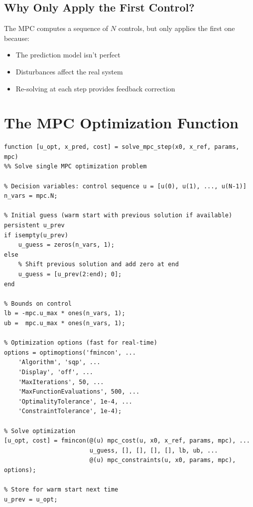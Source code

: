 \documentclass[11pt]{article}
\begin{document}
\subsection{Why Only Apply the First Control?}

The MPC computes a sequence of $N$ controls, but only applies the first one because:
\begin{itemize}
    \item The prediction model isn't perfect
    \item Disturbances affect the real system
    \item Re-solving at each step provides feedback correction
\end{itemize}

\section{The MPC Optimization Function}

\begin{lstlisting}
function [u_opt, x_pred, cost] = solve_mpc_step(x0, x_ref, params, mpc)
%% Solve single MPC optimization problem

% Decision variables: control sequence u = [u(0), u(1), ..., u(N-1)]
n_vars = mpc.N;

% Initial guess (warm start with previous solution if available)
persistent u_prev
if isempty(u_prev)
    u_guess = zeros(n_vars, 1);
else
    % Shift previous solution and add zero at end
    u_guess = [u_prev(2:end); 0];
end

% Bounds on control
lb = -mpc.u_max * ones(n_vars, 1);
ub =  mpc.u_max * ones(n_vars, 1);

% Optimization options (fast for real-time)
options = optimoptions('fmincon', ...
    'Algorithm', 'sqp', ...
    'Display', 'off', ...
    'MaxIterations', 50, ...
    'MaxFunctionEvaluations', 500, ...
    'OptimalityTolerance', 1e-4, ...
    'ConstraintTolerance', 1e-4);

% Solve optimization
[u_opt, cost] = fmincon(@(u) mpc_cost(u, x0, x_ref, params, mpc), ...
                        u_guess, [], [], [], [], lb, ub, ...
                        @(u) mpc_constraints(u, x0, params, mpc), options);

% Store for warm start next time
u_prev = u_opt;
\end{lstlisting}
\end{document}
